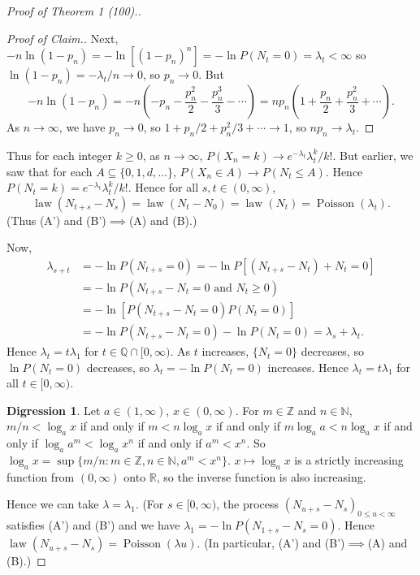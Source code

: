 \documentclass{article}
\DeclareMathOperator{\law}{law}
\DeclareMathOperator{\Poisson}{Poisson}
\newcommand{\R}{\mathbb{R}}
\newcommand{\Q}{\mathbb{Q}}
\newcommand{\Z}{\mathbb{Z}}
\newcommand{\N}{\mathbb{N}}
\theoremstyle{definition}
\newtheorem*{digression}{Digression}
\begin{document}
\begin{proof}[Proof of Theorem 1 (100).]
\begin{proof}[Proof of Claim.]
    Next, $-n\ln(1-p_n) = -\ln[(1-p_n)^n] = -\ln P(N_t = 0) = \lambda_t < \infty$ so $\ln(1-p_n) = -\lambda_t/n \to 0$, so $p_n \to 0$. But
    \[
        -n\ln(1-p_n) = -n\left(-p_n - \frac{p_n^2}2 - \frac{p_n^3}{3} - \cdots \right) = np_n\left(1 + \frac{p_n}{2} + \frac{p_n^2}{3} + \cdots\right).
    \]
    As $n \to \infty$, we have $p_n \to 0$, so $1 + p_n/2 + p_n^2/3 + \cdots \to 1$, so $np_n \to \lambda_t$.
\end{proof}

Thus for each integer $k \geq 0$, as $n \to \infty$, $P(X_n = k) \to e^{-\lambda_t}\lambda_t^k/k!$. But earlier, we saw that for each $A \subseteq \{0, 1, d, \dots\}$, $P(X_n \in A) \to P(N_t \leq A)$. Hence $P(N_t = k) = e^{-\lambda_t}\lambda_t^k/k!$. Hence for all $s, t \in (0, \infty)$,
\[
    \law(N_{t+s} - N_s) = \law(N_t - N_0) = \law(N_t) = \Poisson(\lambda_t).
\]
(Thus (A') and (B')$\implies$(A) and (B).)

Now,
\begin{align*}
    \lambda_{s+t} &= -\ln P(N_{t+s} = 0) = -\ln P[(N_{t+s} - N_t) + N_t = 0] \\
    &= -\ln P(N_{t+s} - N_t = 0 \text{ and } N_t \geq 0) \\
    &= -\ln[P(N_{t+s} - N_t = 0)P(N_t = 0)] \\
    &= -\ln P(N_{t+s} - N_t = 0) - \ln P(N_t = 0) = \lambda_s + \lambda_t.
\end{align*}
Hence $\lambda_t = t\lambda_1$ for $t \in \Q \cap [0, \infty)$.
As $t$ increases, $\{N_t = 0\}$ decreases, so $\ln P(N_t = 0)$ decreases, so $\lambda_t = -\ln P(N_t = 0)$ increases. Hence $\lambda_t = t\lambda_1$ for all $t \in [0, \infty)$.

\begin{digression}
Let $a \in (1, \infty)$, $x \in (0, \infty)$. For $m \in \Z$ and $n \in \N$, $m/n < \log_a x$ if and only if $m < n\log_a x$ if and only if $m\log_a a < n\log_a x$ if and only if $\log_a a^m < \log_a x^n$ if and only if $a^m < x^n$. So $\log_a x = \sup\{m/n : m \in \Z, n \in \N, a^m < x^n\}$. $x \mapsto \log_a x$ is a strictly increasing function from $(0, \infty)$ onto $\R$, so the inverse function is also increasing.
\end{digression}

Hence we can take $\lambda = \lambda_1$. (For  $s \in [0, \infty)$, the process $(N_{u+s} - N_s)_{0 \leq u < \infty}$ satisfies (A') and (B') and we have $\lambda_1 = -\ln P(N_{1+s} - N_s = 0)$. Hence $\law(N_{u+s} - N_s) = \Poisson(\lambda u)$. (In particular, (A') and (B')$\implies$(A) and (B).)
\end{proof}
\end{document}
